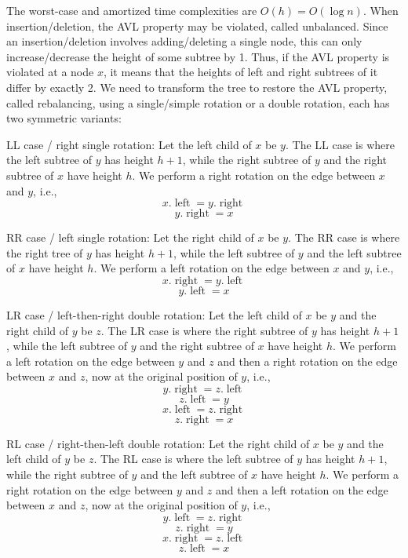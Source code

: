 \documentclass[a4paper,12pt]{article}
\begin{document}
The worst-case and amortized time complexities are $O(h)=O(\log n)$.
When insertion/deletion, the AVL property may be violated, called unbalanced. Since an insertion/deletion involves adding/deleting a single node, this can only increase/decrease the height of some subtree by 1. Thus, if the AVL property is violated at a node $x$, it means that the heights of left and right subtrees of it differ by exactly 2. We need to transform the tree to restore the AVL property, called rebalancing, using a single/simple rotation or a double rotation, each has two symmetric variants:
\bit
\item LL case / right single rotation: Let the left child of $x$ be $y$. The LL case is where the left subtree of $y$ has height $h+1$, while the right subtree of $y$ and the right subtree of $x$ have height $h$. We perform a right rotation on the edge between $x$ and $y$, i.e.,
\[x.\operatorname{left}=y.\operatorname{right}\]
\[y.\operatorname{right}=x\]
\item RR case / left single rotation: Let the right child of $x$ be $y$. The RR case is where the right tree of $y$ has height $h+1$, while the left subtree of $y$ and the left subtree of $x$ have height $h$. We perform a left rotation on the edge between $x$ and $y$, i.e.,
\[x.\operatorname{right}=y.\operatorname{left}\]
\[y.\operatorname{left}=x\]
\item LR case / left-then-right double rotation: Let the left child of $x$ be $y$ and the right child of $y$ be $z$. The LR case is where the right subtree of $y$ has height $h+1$, while the left subtree of $y$ and the right subtree of $x$ have height $h$. We perform a left rotation on the edge between $y$ and $z$ and then a right rotation on the edge between $x$ and $z$, now at the original position of $y$, i.e.,
\[y.\operatorname{right}=z.\operatorname{left}\]
\[z.\operatorname{left}=y\]
\[x.\operatorname{left}=z.\operatorname{right}\]
\[z.\operatorname{right}=x\]
\item RL case / right-then-left double rotation: Let the right child of $x$ be $y$ and the left child of $y$ be $z$. The RL case is where the left subtree of $y$ has height $h+1$, while the right subtree of $y$ and the left subtree of $x$ have height $h$. We perform a right rotation on the edge between $y$ and $z$ and then a left rotation on the edge between $x$ and $z$, now at the original position of $y$, i.e.,
\[y.\operatorname{left}=z.\operatorname{right}\]
\[z.\operatorname{right}=y\]
\[x.\operatorname{right}=z.\operatorname{left}\]
\[z.\operatorname{left}=x\]
\end{document}
